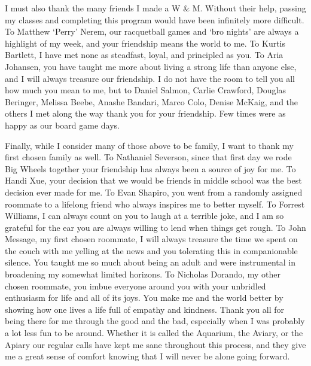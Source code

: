 \documentclass[../main.tex]{subfiles}
\begin{document}
\begin{singlespace}
{{\begin{flushleft}
\end{flushleft}
} %

{\parindent0pt %
\begin{flushleft}
                                                                                 
I must also thank the many friends I made a W $\&$ M. Without their help, passing my classes and completing this program would have been infinitely more difficult. To Matthew `Perry' Nerem, our racquetball games and `bro nights' are always a highlight of my week, and your friendship means the world to me. To Kurtis Bartlett, I have met none as steadfast, loyal, and principled as you. To Aria Johansen, you have taught me more about living a strong life than anyone else, and I will always treasure our friendship. I do not have the room to tell you all how much you mean to me, but to Daniel Salmon, Carlie Crawford, Douglas Beringer, Melissa Beebe, Anashe Bandari, Marco Colo, Denise McKaig, and the others I met along the way thank you for your friendship. Few times were as happy as our board game days.

\end{flushleft}
} %

{\parindent0pt %
\begin{flushleft}
                                                                                 
Finally, while I consider many of those above to be family, I want to thank my first chosen family as well. To Nathaniel Severson, since that first day we rode Big Wheels together your friendship has always been a source of joy for me. To Handi Xue, your decision that we would be friends in middle school was the best decision ever made for me. To Evan Shapiro, you went from a randomly assigned roommate to a lifelong friend who always inspires me to better myself. To Forrest Williams, I can always count on you to laugh at a terrible joke, and I am so grateful for the ear you are always willing to lend when things get rough. To John Message, my first chosen roommate, I will always treasure the time we spent on the couch with me yelling at the news and you tolerating this in companionable silence. You taught me so much about being an adult and were instrumental in broadening my somewhat limited horizons. To Nicholas Dorando, my other chosen roommate, you imbue everyone around you with your unbridled enthusiasm for life and all of its joys. You make me and the world better by showing how one lives a life full of empathy and kindness. Thank you all for being there for me through the good and the bad, especially when I was probably a lot less fun to be around. Whether it is called the Aquarium, the Aviary, or the Apiary our regular calls have kept me sane throughout this process, and they give me a great sense of comfort knowing that I will never be alone going forward.


\end{flushleft}}}
\end{singlespace}
\end{document}
